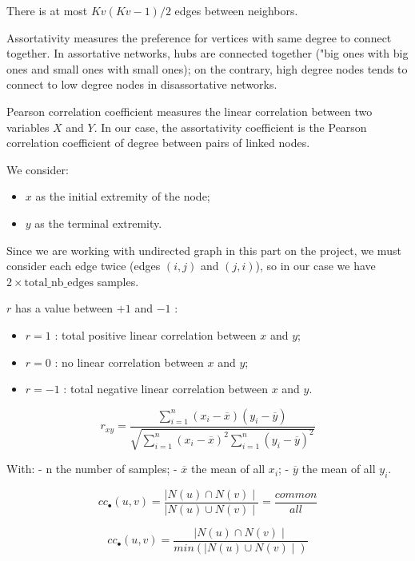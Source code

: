 \documentclass[11pt]{report}
\begin{document}
There is at most $Kv(Kv-1)/2$ edges between neighbors.




Assortativity measures the preference for vertices with same degree to connect together. In assortative networks, hubs are connected together ("big ones with big ones and small ones with small ones); on the contrary, high degree nodes tends to connect to low degree nodes in disassortative networks.

Pearson correlation coefficient measures the linear correlation between two variables $X$ and $Y$.
In our case, the assortativity coefficient is the Pearson correlation coefficient of degree between pairs of linked nodes.

We consider:

\begin{itemize}
    \item $x$ as the initial extremity of the node;
    \item $y$ as the terminal extremity.
\end{itemize}


Since we are working with undirected graph in this part on the project, we must consider each edge twice (edges $(i,j)$ and $(j,i)$), so in our case we have 
$2 \times \textrm{total\_nb\_edges}$ samples.

$r$ has a value between $+1$ and $-1$ : 
\begin{itemize}
	\item $r=1$  : total positive linear correlation between $x$ and $y$;
	\item $r=0$  : no linear correlation between $x$ and $y$;
	\item $r=-1$ : total negative linear correlation between $x$ and $y$.
\end{itemize}

$$\newcommand \xdiff    {(x_{i}-\overline {x})}
\newcommand   \ydiff    {(y_{i}-\overline {y})}
\newcommand   \sumassort{\sum_{i=1}^{n}}
r_{xy} = \dfrac{\sumassort \xdiff \ydiff } {\sqrt{\sumassort \xdiff^{2} \sumassort \ydiff^{2}}}$$

With:
- n the number of samples;
- $\overline{x}$ the mean of all $x_{i}$;
- $\overline{y}$ the mean of all $y_{i}$.



$$cc_{\bullet}(u,v)=\dfrac{\mid N(u)\cap N(v) \mid}
						  {\mid N(u)\cup N(v) \mid} = \dfrac{common}{all}$$
						  
$$cc_{\bullet}(u,v)=\dfrac{\mid N(u)\cap N(v) \mid}
						  {min(\mid N(u)\cup N(v) \mid)}$$
		
\end{document}

